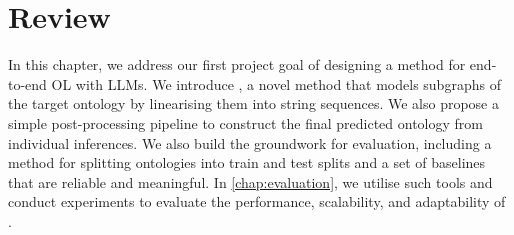 \section{Review}

In this chapter, we address our first project goal of designing a method for end-to-end OL with LLMs. We introduce \name, a novel method that models subgraphs of the target ontology by linearising them into string sequences. We also propose a simple post-processing pipeline to construct the final predicted ontology from individual inferences. We also build the groundwork for evaluation, including a method for splitting ontologies into train and test splits and a set of baselines that are reliable and meaningful. In \cref{chap:evaluation}, we utilise such tools and conduct experiments to evaluate the performance, scalability, and adaptability of \name.
